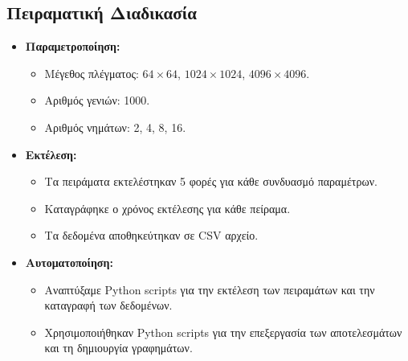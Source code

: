 \documentclass{article}
\begin{document}
\subsection*{Πειραματική Διαδικασία}
\begin{itemize}
    \item \textbf{Παραμετροποίηση:}
    \begin{itemize}
        \item Μέγεθος πλέγματος: $64 \times 64$, $1024 \times 1024$, $4096 \times 4096$.
        \item Αριθμός γενιών: 1000.
        \item Αριθμός νημάτων: 2, 4, 8, 16.
    \end{itemize}
    \item \textbf{Εκτέλεση:}
    \begin{itemize}
        \item Τα πειράματα εκτελέστηκαν 5 φορές για κάθε συνδυασμό παραμέτρων.
        \item Καταγράφηκε ο χρόνος εκτέλεσης για κάθε πείραμα.
        \item Τα δεδομένα αποθηκεύτηκαν σε CSV αρχείο.
    \end{itemize}
    \item \textbf{Αυτοματοποίηση:}
    \begin{itemize}
        \item Αναπτύξαμε Python scripts για την εκτέλεση των πειραμάτων και την καταγραφή των δεδομένων.
        \item Χρησιμοποιήθηκαν Python scripts για την επεξεργασία των αποτελεσμάτων και τη δημιουργία γραφημάτων.
    \end{itemize}
\end{itemize}
\end{document}
